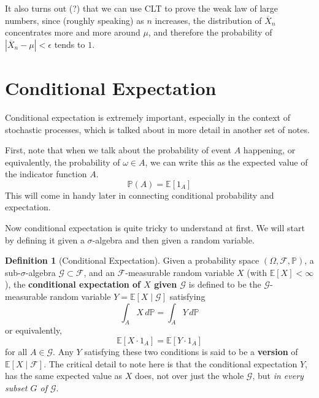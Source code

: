 \documentclass{article}
\theoremstyle{definition}
\theoremstyle{remark}
\theoremstyle{definition}
\newtheorem{definition}{Definition}[section]
\begin{document}
It also turns out (?) that we can use CLT to prove the weak law of large numbers, since (roughly speaking) as $n$ increases, the distribution of $\overline{X}_n$ concentrates more and more around $\mu$, and therefore the probability of $|\overline{X}_n - \mu| < \epsilon$ tends to $1$. 

\section{Conditional Expectation}

Conditional expectation is extremely important, especially in the context of stochastic processes, which is talked about in more detail in another set of notes. 

First, note that when we talk about the probability of event $A$ happening, or equivalently, the probability of $\omega \in A$, we can write this as the expected value of the indicator function $A$. 
\[\mathbb{P}(A) = \mathbb{E}[1_A]\]
This will come in handy later in connecting conditional probability and expectation. 

Now conditional expectation is quite tricky to understand at first. We will start by defining it given a $\sigma$-algebra and then given a random variable. 

\begin{definition}[Conditional Expectation]
Given a probability space $(\Omega, \mathcal{F}, \mathbb{P})$, a sub-$\sigma$-algebra $\mathcal{G} \subset \mathcal{F}$, and an $\mathcal{F}$-measurable random variable $X$ (with $\mathbb{E}[X] < \infty$), the \textbf{conditional expectation of $X$ given $\mathcal{G}$} is defined to be the $\mathcal{G}$-measurable random variable $Y = \mathbb{E}[X \mid \mathcal{G}]$ satisfying 
\[\int_A X \,d\mathbb{P} = \int_A Y \,d \mathbb{P}\]
or equivalently, 
\[\mathbb{E}[X \cdot 1_A] = \mathbb{E}[Y \cdot 1_A]\]
for all $A \in \mathcal{G}$. Any $Y$ satisfying these two conditions is said to be a \textbf{version} of $\mathbb{E}[X \mid \mathcal{F}]$. The critical detail to note here is that the conditional expectation $Y$, has the same expected value as $X$ does, not over just the whole $\mathcal{G}$, but \textit{in every subset $G$ of $\mathcal{G}$}. 
\end{definition}
\end{document}
